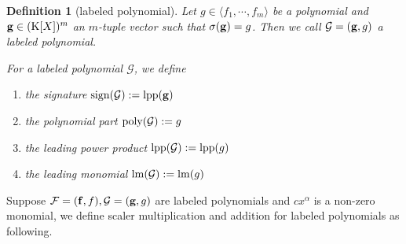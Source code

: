 \documentclass[preprint,authoryear,3p,12pt]{elsarticle}
\newtheorem{define}[theorem]{Definition}
\def\K{{\rm K}}
\def\lm{{\rm lm}}
\def\lpp{{\rm lpp}}
\def\fb{{\bf f}}
\def\eb{{\bf e}}
\def\gb{{\bf g}}
\def\hb{{\bf h}}
\def\s{{\rm{sign}}}
\def\p{{\rm{poly}}}
\begin{document}
\begin{define}[labeled polynomial]
Let $g\in \langle f_1, \cdots, f_m\rangle$ be a polynomial and $\gb\in (\K[X])^m$ an $m$-tuple vector such that $\sigma(\gb)=g$.
Then we call ${\mathcal G}=(\gb, g)$   a labeled polynomial.


For a labeled polynomial ${\mathcal G}$, we define
\begin{enumerate}
\item the signature $\s({\mathcal G}):=\lpp(\gb)$
\item the polynomial part $\p({\mathcal G}):=g$
\item the leading power product  $\lpp({\mathcal G}):=\lpp(g)$
\item  the leading monomial $\lm({\mathcal G}):=\lm(g)$
\end{enumerate}
\end{define}





 Suppose ${\mathcal F}=(\fb, f), {\mathcal G}=(\gb,
g) $ are labeled polynomials and  $cx^\alpha$ is a non-zero monomial, we define scaler multiplication and addition for labeled
polynomials as following.
\end{document}
